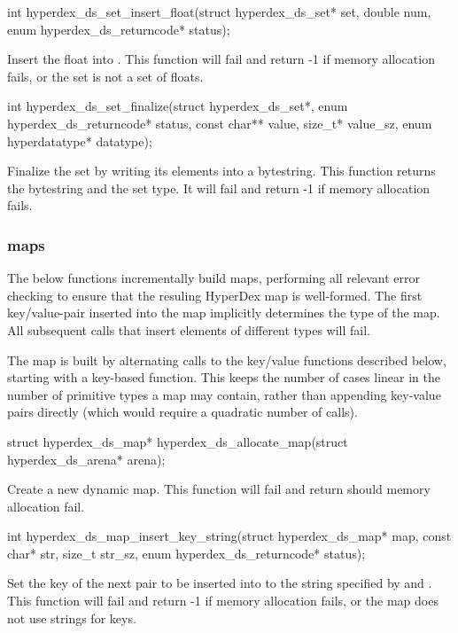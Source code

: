 \funcsep
\begin{ccode}
int hyperdex_ds_set_insert_float(struct hyperdex_ds_set* set, double num,
                                 enum hyperdex_ds_returncode* status);
\end{ccode}
\funcdesc Insert the float  into .  This function will fail
and return -1 if memory allocation fails, or the set is not a set of floats.

\funcsep
\begin{ccode}
int hyperdex_ds_set_finalize(struct hyperdex_ds_set*,
                             enum hyperdex_ds_returncode* status,
                             const char** value, size_t* value_sz,
                             enum hyperdatatype* datatype);
\end{ccode}
\funcdesc Finalize the set by writing its elements into a bytestring.  This
function returns the bytestring and the set type.  It will fail and return -1 if
memory allocation fails.

\subsubsection{maps}

The below functions incrementally build maps, performing all relevant error
checking to ensure that the resuling HyperDex map is well-formed.  The first
key/value-pair inserted into the map implicitly determines the type of the map.  All
subsequent calls that insert elements of different types will fail.

The map is built by alternating calls to the key/value functions described
below, starting with a key-based function.  This keeps the number of cases
linear in the number of primitive types a map may contain, rather than appending
key-value pairs directly (which would require a quadratic number of calls).

\begin{ccode}
struct hyperdex_ds_map* hyperdex_ds_allocate_map(struct hyperdex_ds_arena* arena);
\end{ccode}
\funcdesc Create a new dynamic map.  This function will fail and return
 should memory allocation fail.

\funcsep
\begin{ccode}
int hyperdex_ds_map_insert_key_string(struct hyperdex_ds_map* map,
                                      const char* str, size_t str_sz,
                                      enum hyperdex_ds_returncode* status);
\end{ccode}
\funcdesc Set the key of the next pair to be inserted into  to the
string specified by  and .  This function will fail and
return -1 if memory allocation fails, or the map does not use strings for keys.

